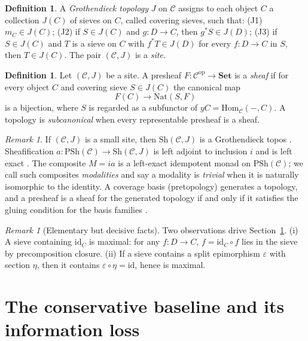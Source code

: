 \documentclass[11pt]{amsart}
\theoremstyle{definition}
\newtheorem{definition}[theorem]{Definition}
\theoremstyle{remark}
\newtheorem{remark}[theorem]{Remark}
\newcommand{\id}{\mathrm{id}}
\newcommand{\PSh}{\mathrm{PSh}}
\newcommand{\Sh}{\mathrm{Sh}}
\newcommand{\Set}{\mathbf{Set}}
\newcommand{\Hom}{\mathrm{Hom}}
\newcommand{\cC}{\mathcal{C}}
\begin{document}
\begin{definition}\label{def:topology}
A \emph{Grothendieck topology} $J$ on $\cC$ assigns to each object $C$ a collection $J(C)$ of sieves on $C$, called covering sieves, such that: (J1) $m_C\in J(C)$; (J2) if $S\in J(C)$ and $g:D\to C$, then $g^{*}S\in J(D)$; (J3) if $S\in J(C)$ and $T$ is a sieve on $C$ with $f^{*}T\in J(D)$ for every $f:D\to C$ in $S$, then $T\in J(C)$. The pair $(\cC,J)$ is a \emph{site}.
\end{definition}

\begin{definition}\label{def:sheaf}
Let $(\cC,J)$ be a site. A presheaf $F:\cC^{\mathrm{op}}\to\Set$ is a \emph{sheaf} if for every object $C$ and covering sieve $S\in J(C)$ the canonical map
\[
F(C)\longrightarrow \mathrm{Nat}(S,F)
\]
is a bijection, where $S$ is regarded as a subfunctor of $yC=\Hom_{\cC}(-,C)$. A topology is \emph{subcanonical} when every representable presheaf is a sheaf.
\end{definition}

\begin{remark}\label{rem:background}
If $(\cC,J)$ is a small site, then $\Sh(\cC,J)$ is a Grothendieck topos \cite[Chap.~VII]{maclane}. Sheafification $a:\PSh(\cC)\to\Sh(\cC,J)$ is left adjoint to inclusion $i$ and is left exact \cite{stacks00W1}. The composite $M=ia$ is a left-exact idempotent monad on $\PSh(\cC)$; we call such composites \emph{modalities} and say a modality is \emph{trivial} when it is naturally isomorphic to the identity. A coverage basis (pretopology) generates a topology, and a presheaf is a sheaf for the generated topology if and only if it satisfies the gluing condition for the basis families \cite{stacks00ZC}.
\end{remark}

\begin{remark}[Elementary but decisive facts]\label{rem:facts}
Two observations drive Section~\ref{sec:collapse}. (i) A sieve containing $\id_C$ is maximal: for any $f:D\to C$, $f=\id_C\circ f$ lies in the sieve by precomposition closure. (ii) If a sieve contains a split epimorphism $\varepsilon$ with section $\eta$, then it contains $\varepsilon\circ\eta=\id$, hence is maximal.
\end{remark}

\section{The conservative baseline and its information loss}\label{sec:collapse}
\end{document}
